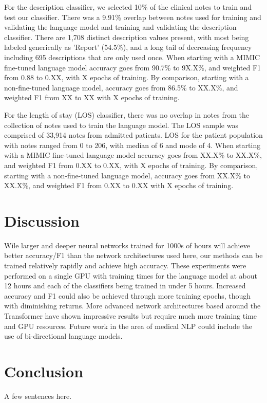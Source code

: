\documentclass{amia}
\begin{document}
For the description classifier, we selected 10\% of the clinical notes to train and test our classifier. There was a 9.91\% overlap between notes used for training and validating the language model and training and validating the description classifier. There are 1,708 distinct description values present, with most being labeled generically as 'Report' (54.5\%), and a long tail of decreasing frequency including 695 descriptions that are only used once. When starting with a MIMIC fine-tuned language model accuracy goes from 90.7\% to 9X.X\%, and weighted F1 from 0.88 to 0.XX, with X epochs of training. By comparison, starting with a non-fine-tuned language model, accuracy goes from 86.5\% to XX.X\%, and weighted F1 from XX to XX with X epochs of training.

For the length of stay (LOS) classifier, there was no overlap in notes from the collection of notes used to train the language model. The LOS sample was comprised of 33,914 notes from admitted patients. LOS for the patient population with notes ranged from 0 to 206, with median of 6 and mode of 4. When starting with a MIMIC fine-tuned language model accuracy goes from XX.X\% to XX.X\%, and weighted F1 from 0.XX to 0.XX, with X epochs of training. By comparison, starting with a non-fine-tuned language model, accuracy goes from XX.X\% to XX.X\%, and weighted F1 from 0.XX to 0.XX with X epochs of training.

\section*{Discussion}

Wile larger and deeper neural networks trained for 1000s of hours will achieve better accuracy/F1 than the network architectures used here, our methods can be trained relatively rapidly and achieve high accuracy. These experiments were performed on a single GPU with training times for the language model at about 12 hours and each of the classifiers being trained in under 5 hours. Increased accuracy and F1 could also be achieved through more training epochs, though with diminishing returns. More advanced network architectures based around the Transformer\cite{vaswani_attention_2017} have shown impressive results but require much more training time and GPU resources. Future work in the area of medical NLP could include the use of bi-directional language models.

\section*{Conclusion}

A few sentences here.



\end{document}
